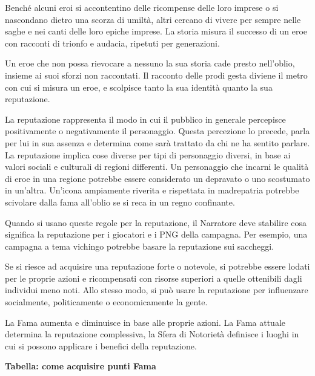 \documentclass[a4paper,twoside,openany]{book}
\begin{document}
\begin{multicols}{2}

Benché alcuni eroi si accontentino delle ricompense delle loro imprese o si nascondano dietro una scorza di umiltà, altri cercano di vivere per sempre nelle saghe e nei canti delle loro epiche imprese. La storia misura il successo di un eroe con racconti di trionfo e audacia, ripetuti per generazioni.

Un eroe che non possa rievocare a nessuno la sua storia cade presto nell'oblio, insieme ai suoi sforzi non raccontati. Il racconto delle prodi gesta diviene il metro con cui si misura un eroe, e scolpisce tanto la sua identità quanto la sua reputazione.

La reputazione rappresenta il modo in cui il pubblico in generale percepisce positivamente o negativamente il personaggio. Questa percezione lo precede, parla per lui in sua assenza e determina come sarà trattato da chi ne ha sentito parlare. La reputazione implica cose diverse per tipi di personaggio diversi, in base ai valori sociali e culturali di regioni differenti. Un personaggio che incarni le qualità di eroe in una regione potrebbe essere considerato un depravato o uno scostumato in un'altra. Un'icona ampiamente riverita e rispettata in madrepatria potrebbe scivolare dalla fama all'oblio se si reca in un regno confinante.

Quando si usano queste regole per la reputazione, il Narratore deve stabilire cosa significa la reputazione per i giocatori e i PNG della campagna. Per esempio, una campagna a tema vichingo potrebbe basare la reputazione sui saccheggi.

Se si riesce ad acquisire una reputazione forte o notevole, si potrebbe essere lodati per le proprie azioni e ricompensati con risorse superiori a quelle ottenibili dagli individui meno noti. Allo stesso modo, si può usare la reputazione per influenzare socialmente, politicamente o economicamente la gente.

La Fama aumenta e diminuisce in base alle proprie azioni. La Fama attuale determina la reputazione complessiva, la Sfera di Notorietà definisce i luoghi in cui si possono applicare i benefici della reputazione.



\textbf{Tabella: come acquisire punti Fama}

\medskip


\end{multicols}
\end{document}
